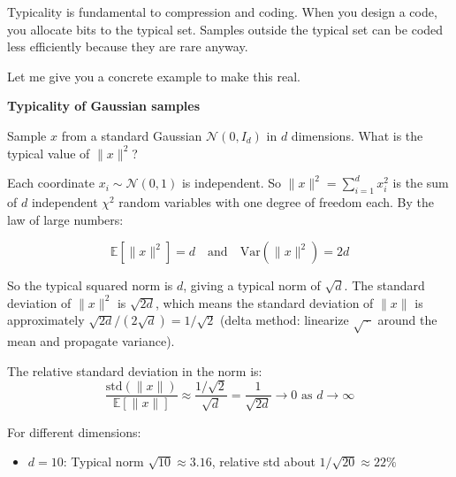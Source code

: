 \vspace{1em}

Typicality is fundamental to compression and coding. When you design a code, you allocate bits to the typical set. Samples outside the typical set can be coded less efficiently because they are rare anyway.

\vspace{2em}

Let me give you a concrete example to make this real.

\vspace{1.5em}

\begin{examplebox}
\textbf{Typicality of Gaussian samples}

\vspace{0.5em}

Sample $x$ from a standard Gaussian $\mathcal{N}(0, I_d)$ in $d$ dimensions. What is the typical value of $\|x\|^2$?

\vspace{0.5em}

Each coordinate $x_i \sim \mathcal{N}(0, 1)$ is independent. So $\|x\|^2 = \sum_{i=1}^d x_i^2$ is the sum of $d$ independent $\chi^2$ random variables with one degree of freedom each. By the law of large numbers:

\begin{equation*}
\mathbb{E}[\|x\|^2] = d \quad \text{and} \quad \text{Var}(\|x\|^2) = 2d
\end{equation*}

So the typical squared norm is $d$, giving a typical norm of $\sqrt{d}$. The standard deviation of $\|x\|^2$ is $\sqrt{2d}$, which means the standard deviation of $\|x\|$ is approximately $\sqrt{2d}/(2\sqrt{d}) = 1/\sqrt{2}$ (delta method: linearize $\sqrt{\,\cdot\,}$ around the mean and propagate variance).

\vspace{0.5em}

The relative standard deviation in the norm is:
\begin{equation*}
\frac{\text{std}(\|x\|)}{\mathbb{E}[\|x\|]} \approx \frac{1/\sqrt{2}}{\sqrt{d}} = \frac{1}{\sqrt{2d}} \to 0 \text{ as } d \to \infty
\end{equation*}

\vspace{0.5em}

For different dimensions:

\begin{itemize}
\item $d = 10$: Typical norm $\sqrt{10} \approx 3.16$, relative std about $1/\sqrt{20} \approx 22\%$


\end{itemize}
\end{examplebox}
